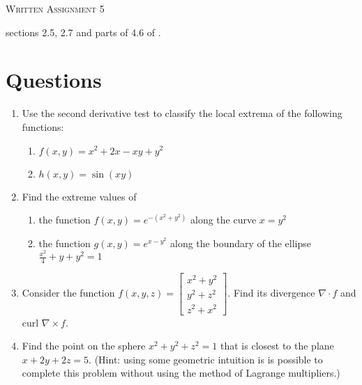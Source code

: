 \documentclass{article}
\date{}
\begin{document}
\begin{center}
\textsc{\LARGE Written Assignment 5}\\[0.5cm]
\end{center}
\From sections 2.5, 2.7 and parts of 4.6 of \VCT.

\section*{Questions}

\begin{enumerate}

\item

Use the second derivative test to classify the local extrema of the
following functions:
\begin{enumerate}
 \item $f(x,y) = x^2 + 2x - xy + y^2$
 \item $h(x,y) = \sin(xy)$
\end{enumerate}

\item

Find the extreme values of
\begin{enumerate}
 \item the function
  $f(x,y) = e^{-(x^2+y^2)}$
  along the curve $x = y^2$
 \item the function
  $g(x,y) = e^{x-y^2}$ along the boundary of the ellipse
  $\frac{x^2}{4}+y+y^2=1$
\end{enumerate}

\item

Consider the function $f(x,y,z) = \begin{bmatrix}
                                   x^2 + y^2 \\
                                   y^2 + z^2 \\
                                   z^2 + x^2
                                  \end{bmatrix}$.
Find its divergence $\nabla \cdot f$ and curl $\nabla \times f$.

\item

Find the point on the sphere $x^2 + y^2 + z^2 = 1$ that is closest
to the plane $x + 2y + 2z = 5$. (Hint: using some geometric intuition
is is possible to complete this problem without using the method of
Lagrange multipliers.)


\end{enumerate}
\end{document}

